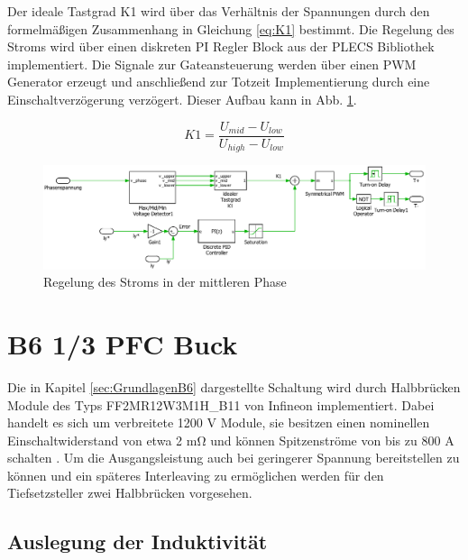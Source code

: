	Der ideale Tastgrad K1 wird über das Verhältnis der Spannungen durch den formelmäßigen Zusammenhang in Gleichung \ref{eq:K1} bestimmt. Die Regelung des Stroms wird über einen diskreten PI Regler Block aus der PLECS Bibliothek implementiert. Die Signale zur Gateansteuerung werden über einen PWM Generator erzeugt und anschließend zur Totzeit Implementierung durch eine Einschaltverzögerung verzögert. Dieser Aufbau kann in Abb. \ref{fig:plecsiafivsk1}.
	
	\begin{equation}
		\label{eq:K1}
		K1 = \dfrac{U_{mid}- U_{low}}{U_{high} -U_{low}} 
	\end{equation}
	
	\begin{figure}
		\centering
		\includegraphics[width=0.9\linewidth]{content/Grafiken/PlecsIAFivsK1}
		\caption{Regelung des Stroms in der mittleren Phase}
		\label{fig:plecsiafivsk1}
	\end{figure}
	
	

\section{B6 1/3 PFC Buck}
Die in Kapitel \ref{sec:GrundlagenB6} dargestellte Schaltung wird durch Halbbrücken Module des Typs FF2MR12W3M1H\_B11 von Infineon implementiert. Dabei handelt es sich um verbreitete 1200 \si{\volt} Module, sie besitzen einen nominellen Einschaltwiderstand von etwa 2 \si{\milli \ohm} und können Spitzenströme von bis zu 800 \si{\ampere} schalten \cite{IFAGFF2}. Um die Ausgangsleistung auch bei geringerer Spannung bereitstellen zu können und ein späteres Interleaving zu ermöglichen werden für den Tiefsetzsteller zwei Halbbrücken vorgesehen.

\subsection{Auslegung der Induktivität}


